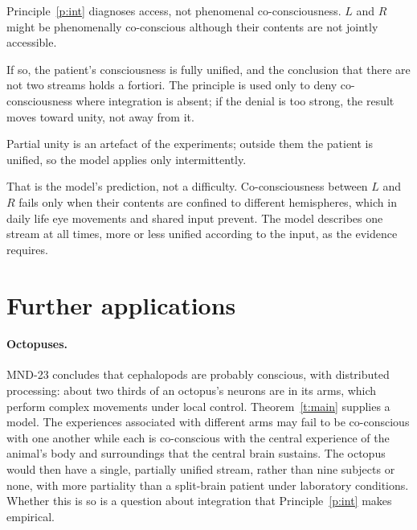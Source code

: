 \documentclass{situationist-preprint}
\begin{document}
\begin{objection}[Access]\label{o:access}
Principle~\ref{p:int} diagnoses access, not phenomenal co-consciousness. $L$ and $R$ might be phenomenally co-conscious although their contents are not jointly accessible.
\end{objection}

\begin{reply}
If so, the patient's consciousness is fully unified, and the conclusion that there are not two streams holds a fortiori. The principle is used only to deny co-consciousness where integration is absent; if the denial is too strong, the result moves toward unity, not away from it.
\end{reply}

\begin{objection}[Ad hoc]\label{o:adhoc}
Partial unity is an artefact of the experiments; outside them the patient is unified, so the model applies only intermittently.
\end{objection}

\begin{reply}
That is the model's prediction, not a difficulty. Co-consciousness between $L$ and $R$ fails only when their contents are confined to different hemispheres, which in daily life eye movements and shared input prevent. The model describes one stream at all times, more or less unified according to the input, as the evidence requires.
\end{reply}

\section{Further applications}

\paragraph{Octopuses.} MND-23 concludes that cephalopods are probably conscious, with distributed processing: about two thirds of an octopus's neurons are in its arms, which perform complex movements under local control. Theorem~\ref{t:main} supplies a model. The experiences associated with different arms may fail to be co-conscious with one another while each is co-conscious with the central experience of the animal's body and surroundings that the central brain sustains. The octopus would then have a single, partially unified stream, rather than nine subjects or none, with more partiality than a split-brain patient under laboratory conditions. Whether this is so is a question about integration that Principle~\ref{p:int} makes empirical.
\end{document}

